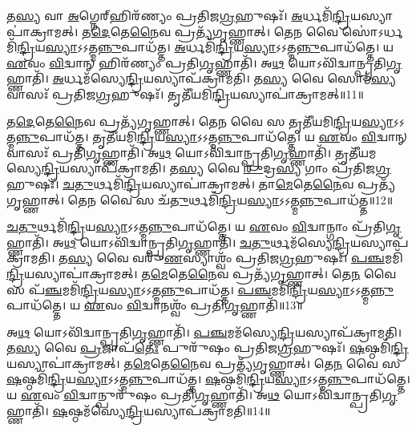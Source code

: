 𑌤\-\ul{𑌸𑍍𑌯} 𑌵𑌾 \ul{𑌅}\-𑌗𑍍𑌨𑍇𑌰𑍍‌\mbox{}𑌹𑌿𑌰᳴𑌣𑍍𑌯𑌂 𑌪𑍍𑌰𑌤𑌿𑌜\-\ul{𑌗𑍍𑌰}\-𑌹𑍁𑌷𑌃᳴।
\-\ul{𑌅}\-𑌰𑍍𑌧𑌮𑌿᳴\-\ul{𑌨𑍍𑌦𑍍𑌰𑌿}\-𑌯\-𑌸𑍍𑌯𑌾𑌪𑌾॑\-𑌕𑍍𑌰𑌾𑌮𑌤𑍍।
𑌤\-\ul{𑌦𑍇}\-𑌤𑍇\-\ul{𑌨𑍈}\-𑌵 𑌪𑍍𑌰𑌤𑍍𑌯᳴𑌗𑍃𑌹𑍍𑌣𑌾𑌤𑍍।
𑌤𑍇\-\ul{𑌨} 𑌵𑍈 𑌸𑍋॑\-𑌽𑌰𑍍𑌧𑌮𑌿᳴\-\ul{𑌨𑍍𑌦𑍍𑌰𑌿}\-𑌯\-\-\ul{𑌸𑍍𑌯𑌾}\-\-𑌽𑌽𑌤𑍍𑌮\-\ul{𑌨𑍍𑌨𑍁}\-𑌪𑌾\-𑌧᳴𑌤𑍍𑌤।
\-\ul{𑌅}\-𑌰𑍍𑌧𑌮𑌿᳴\-\ul{𑌨𑍍𑌦𑍍𑌰𑌿}\-𑌯\-\-\ul{𑌸𑍍𑌯𑌾}\-\-𑌽𑌽𑌤𑍍𑌮\-\ul{𑌨𑍍𑌨𑍁}\-𑌪𑌾\-𑌧᳴𑌤𑍍𑌤𑍇।
𑌯 \ul{𑌏}\-𑌵𑌂 \ul{𑌵𑌿}\-𑌦𑍍𑌵𑌾𑌨𑍍 𑌹𑌿𑌰᳴𑌣𑍍𑌯𑌂 𑌪𑍍𑌰𑌤𑌿\-\ul{𑌗𑍃}\-𑌹𑍍𑌣𑌾𑌤𑌿᳴।
𑌅\-\ul{𑌥} 𑌯𑍋𑌽𑌵𑌿᳴𑌦𑍍𑌵𑌾𑌨𑍍𑌪𑍍𑌰𑌤𑌿\-\-\ul{𑌗𑍃}\-𑌹𑍍𑌣𑌾𑌤𑌿᳴।
\-\ul{𑌅}\-𑌰𑍍𑌧𑌮᳴𑌸𑍍𑌯𑍇\-\ul{𑌨𑍍𑌦𑍍𑌰𑌿}\-𑌯\-𑌸𑍍𑌯𑌾𑌪᳴\-𑌕𑍍𑌰𑌾𑌮𑌤𑌿।
𑌤\-\ul{𑌸𑍍𑌯} 𑌵𑍈 𑌸𑍋𑌮᳴\-\ul{𑌸𑍍𑌯} 𑌵𑌾𑌸𑌃᳴ 𑌪𑍍𑌰𑌤𑌿𑌜\-\ul{𑌗𑍍𑌰}\-𑌹𑍁𑌷𑌃᳴।
𑌤𑍃𑌤𑍀᳴𑌯𑌮𑌿\-\ul{𑌨𑍍𑌦𑍍𑌰𑌿}\-𑌯\-𑌸𑍍𑌯𑌾𑌪𑌾॑𑌕𑍍𑌰𑌾𑌮𑌤𑍍॥11॥

𑌤\-\ul{𑌦𑍇}\-𑌤𑍇\-\ul{𑌨𑍈}\-𑌵 𑌪𑍍𑌰𑌤𑍍𑌯᳴𑌗𑍃𑌹𑍍𑌣𑌾𑌤𑍍।
𑌤𑍇\-\ul{𑌨} 𑌵𑍈 𑌸 𑌤𑍃𑌤𑍀᳴𑌯𑌮𑌿\-\ul{𑌨𑍍𑌦𑍍𑌰𑌿}\-𑌯\-\-\ul{𑌸𑍍𑌯𑌾}\-\-𑌽𑌽𑌤𑍍𑌮\-\ul{𑌨𑍍𑌨𑍁}\-𑌪𑌾\-𑌧᳴𑌤𑍍𑌤।
𑌤𑍃𑌤𑍀᳴𑌯𑌮𑌿\-\ul{𑌨𑍍𑌦𑍍𑌰𑌿}\-𑌯\-\-\ul{𑌸𑍍𑌯𑌾}\-\-𑌽𑌽𑌤𑍍𑌮\-\ul{𑌨𑍍𑌨𑍁}\-𑌪𑌾\-𑌧᳴𑌤𑍍𑌤𑍇।
𑌯 \ul{𑌏}\-𑌵𑌂 \ul{𑌵𑌿}\-𑌦𑍍𑌵𑌾𑌨𑍍 𑌵𑌾𑌸𑌃᳴ 𑌪𑍍𑌰𑌤𑌿\-\ul{𑌗𑍃}\-𑌹𑍍𑌣𑌾𑌤𑌿᳴।
𑌅\-\ul{𑌥} 𑌯𑍋𑌽𑌵𑌿᳴𑌦𑍍𑌵𑌾𑌨𑍍𑌪𑍍𑌰𑌤𑌿\-\-\ul{𑌗𑍃}\-𑌹𑍍𑌣𑌾𑌤𑌿᳴।
𑌤𑍃𑌤𑍀᳴𑌯𑌮𑌸𑍍𑌯𑍇\-\ul{𑌨𑍍𑌦𑍍𑌰𑌿}\-𑌯\-𑌸𑍍𑌯𑌾𑌪᳴\-𑌕𑍍𑌰𑌾𑌮𑌤𑌿।
𑌤\-\ul{𑌸𑍍𑌯} 𑌵𑍈 \ul{𑌰𑍁}\-𑌦𑍍𑌰\-\ul{𑌸𑍍𑌯} 𑌗𑌾𑌂 𑌪𑍍𑌰᳴𑌤𑌿𑌜\-\ul{𑌗𑍍𑌰}\-𑌹𑍁𑌷𑌃᳴।
\-\ul{𑌚}\-\-\ul{𑌤𑍁}\-𑌰𑍍𑌥𑌮𑌿᳴\-\ul{𑌨𑍍𑌦𑍍𑌰𑌿}\-𑌯\-𑌸𑍍𑌯𑌾𑌪𑌾॑\-𑌕𑍍𑌰𑌾𑌮𑌤𑍍।
𑌤𑌾\-\ul{𑌮𑍇}\-𑌤𑍇\-\ul{𑌨𑍈}\-𑌵 𑌪𑍍𑌰𑌤𑍍𑌯᳴𑌗𑍃𑌹𑍍𑌣𑌾𑌤𑍍।
𑌤𑍇\-\ul{𑌨} 𑌵𑍈 𑌸 𑌚᳴\-\ul{𑌤𑍁}\-𑌰𑍍𑌥𑌮𑌿᳴\-\ul{𑌨𑍍𑌦𑍍𑌰𑌿}\-𑌯\-\-\ul{𑌸𑍍𑌯𑌾}\-\-𑌽𑌽𑌤𑍍𑌮\-\ul{𑌨𑍍𑌨𑍁}\-𑌪𑌾\-𑌧᳴𑌤𑍍𑌤॥12॥

\-\ul{𑌚}\-\-\ul{𑌤𑍁}\-𑌰𑍍𑌥𑌮𑌿᳴\-\ul{𑌨𑍍𑌦𑍍𑌰𑌿}\-𑌯\-\-\ul{𑌸𑍍𑌯𑌾}\-\-𑌽𑌽𑌤𑍍𑌮\-\ul{𑌨𑍍𑌨𑍁}\-𑌪𑌾\-𑌧᳴𑌤𑍍𑌤𑍇।
𑌯 \ul{𑌏}\-𑌵𑌂 \ul{𑌵𑌿}\-𑌦𑍍𑌵𑌾𑌨𑍍𑌗𑌾𑌂 𑌪𑍍𑌰᳴𑌤𑌿\-\ul{𑌗𑍃}\-𑌹𑍍𑌣𑌾𑌤𑌿᳴।
𑌅\-\ul{𑌥} 𑌯𑍋𑌽𑌵𑌿᳴𑌦𑍍𑌵𑌾𑌨𑍍𑌪𑍍𑌰𑌤𑌿\-\ul{𑌗𑍃}\-𑌹𑍍𑌣𑌾𑌤𑌿᳴।
\-\ul{𑌚}\-\-\ul{𑌤𑍁}\-𑌰𑍍𑌥𑌮᳴𑌸𑍍𑌯𑍇\-\ul{𑌨𑍍𑌦𑍍𑌰𑌿}\-𑌯\-𑌸𑍍𑌯𑌾𑌪᳴\-𑌕𑍍𑌰𑌾𑌮𑌤𑌿।
𑌤\-\ul{𑌸𑍍𑌯} 𑌵𑍈 𑌵𑌰𑍁᳴\-\ul{𑌣}\-𑌸𑍍𑌯𑌾𑌶𑍍𑌵𑌂᳴ 𑌪𑍍𑌰𑌤𑌿𑌜\-\ul{𑌗𑍍𑌰}\-𑌹𑍁𑌷𑌃᳴।
\-\ul{𑌪}\-\-\ul{𑌞𑍍𑌚}\-𑌮𑌮𑌿᳴\-\ul{𑌨𑍍𑌦𑍍𑌰𑌿}\-𑌯\-𑌸𑍍𑌯𑌾𑌪𑌾॑\-𑌕𑍍𑌰𑌾𑌮𑌤𑍍।
𑌤\-\ul{𑌮𑍇}\-𑌤𑍇\-\ul{𑌨𑍈}\-𑌵 𑌪𑍍𑌰𑌤𑍍𑌯᳴𑌗𑍃𑌹𑍍𑌣𑌾𑌤𑍍।
𑌤𑍇\-\ul{𑌨} 𑌵𑍈 𑌸 𑌪᳴\-\ul{𑌞𑍍𑌚}\-𑌮𑌮𑌿᳴\-\ul{𑌨𑍍𑌦𑍍𑌰𑌿}\-𑌯\-\-\ul{𑌸𑍍𑌯𑌾}\-\-𑌽𑌽𑌤𑍍𑌮\-\ul{𑌨𑍍𑌨𑍁}\-𑌪𑌾\-𑌧᳴𑌤𑍍𑌤।
\-\ul{𑌪}\-\-\ul{𑌞𑍍𑌚}\-𑌮𑌮𑌿᳴\-\ul{𑌨𑍍𑌦𑍍𑌰𑌿}\-𑌯\-\-\ul{𑌸𑍍𑌯𑌾}\-\-𑌽𑌽𑌤𑍍𑌮\-\ul{𑌨𑍍𑌨𑍁}\-𑌪𑌾\-𑌧᳴𑌤𑍍𑌤𑍇।
𑌯 \ul{𑌏}\-𑌵𑌂 \ul{𑌵𑌿}\-𑌦𑍍𑌵𑌾𑌨𑌶𑍍𑌵𑌂᳴ 𑌪𑍍𑌰𑌤𑌿\-\-\ul{𑌗𑍃}\-𑌹𑍍𑌣𑌾𑌤𑌿᳴॥13॥

𑌅\-\ul{𑌥} 𑌯𑍋𑌽𑌵𑌿᳴𑌦𑍍𑌵𑌾𑌨𑍍𑌪𑍍𑌰𑌤𑌿\-\ul{𑌗𑍃}\-𑌹𑍍𑌣𑌾𑌤𑌿᳴।
\-\ul{𑌪}\-\-\ul{𑌞𑍍𑌚}\-𑌮𑌮᳴𑌸𑍍𑌯𑍇\-\ul{𑌨𑍍𑌦𑍍𑌰𑌿}\-𑌯\-𑌸𑍍𑌯𑌾𑌪᳴\-𑌕𑍍𑌰𑌾𑌮𑌤𑌿।
𑌤\-\ul{𑌸𑍍𑌯} 𑌵𑍈 \ul{𑌪𑍍𑌰}\-𑌜𑌾𑌪᳴\-\ul{𑌤𑍇𑌃} 𑌪𑍁𑌰𑍁᳴𑌷𑌂 𑌪𑍍𑌰𑌤𑌿\-𑌜\-\ul{𑌗𑍍𑌰}\-𑌹𑍁𑌷𑌃᳴।
\-\ul{𑌷}\-𑌷𑍍𑌠𑌮𑌿᳴\-\ul{𑌨𑍍𑌦𑍍𑌰𑌿}\-𑌯\-𑌸𑍍𑌯𑌾𑌪𑌾॑𑌕𑍍𑌰𑌾𑌮𑌤𑍍।
𑌤\-\ul{𑌮𑍇}\-𑌤𑍇\-\ul{𑌨𑍈}\-𑌵 𑌪𑍍𑌰𑌤𑍍𑌯᳴𑌗𑍃𑌹𑍍𑌣𑌾𑌤𑍍।
𑌤𑍇\-\ul{𑌨} 𑌵𑍈 𑌸 \ul{𑌷}\-𑌷𑍍𑌠𑌮𑌿᳴\-\ul{𑌨𑍍𑌦𑍍𑌰𑌿}\-𑌯\-\-\ul{𑌸𑍍𑌯𑌾}\-\-𑌽𑌽𑌤𑍍𑌮\-\ul{𑌨𑍍𑌨𑍁}\-𑌪𑌾\-𑌧᳴𑌤𑍍𑌤।
\-\ul{𑌷}\-𑌷𑍍𑌠𑌮𑌿᳴\-\ul{𑌨𑍍𑌦𑍍𑌰𑌿}\-𑌯\-\-\ul{𑌸𑍍𑌯𑌾}\-\-𑌽𑌽𑌤𑍍𑌮\-\ul{𑌨𑍍𑌨𑍁}\-𑌪𑌾\-𑌧᳴𑌤𑍍𑌤𑍇।
𑌯 \ul{𑌏}\-𑌵𑌂 \ul{𑌵𑌿}\-𑌦𑍍𑌵𑌾𑌨𑍍𑌪𑍁𑌰𑍁᳴𑌷𑌂 𑌪𑍍𑌰𑌤𑌿\-\-\ul{𑌗𑍃}\-𑌹𑍍𑌣𑌾𑌤𑌿᳴।
𑌅\-\ul{𑌥} 𑌯𑍋𑌽𑌵𑌿᳴𑌦𑍍𑌵𑌾𑌨𑍍𑌪𑍍𑌰𑌤𑌿\-\-\ul{𑌗𑍃}\-𑌹𑍍𑌣𑌾𑌤𑌿᳴।
\-\ul{𑌷}\-𑌷𑍍𑌠𑌮᳴𑌸𑍍𑌯𑍇\-\ul{𑌨𑍍𑌦𑍍𑌰𑌿}\-𑌯\-𑌸𑍍𑌯𑌾𑌪᳴\-𑌕𑍍𑌰𑌾𑌮𑌤𑌿॥14॥

